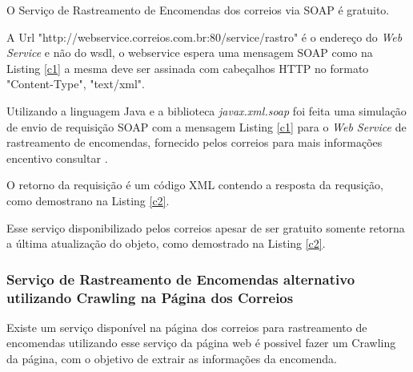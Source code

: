 \documentclass[12pt]{article}
\begin{document}
O Serviço de Rastreamento de Encomendas dos correios via SOAP é gratuito.

A Url "http://webservice.correios.com.br:80/service/rastro" é o endereço do \textit{Web Service} e não do wsdl, o webservice espera uma mensagem SOAP como na Listing \ref{c1} a mesma deve ser assinada com cabeçalhos HTTP no formato "Content-Type", "text/xml".


Utilizando a linguagem Java e a biblioteca \textit{javax.xml.soap} foi feita uma simulação de envio de requisição SOAP com a mensagem Listing \ref{c1} para o \textit{Web Service} de rastreamento de encomendas, fornecido pelos correios para mais informações encentivo consultar \cite{correios}.

O retorno da requisição é um código XML contendo a resposta da requsição, como demostrano na Listing \ref{c2}.
 
 Esse serviço disponibilizado pelos correios apesar de ser gratuito somente retorna a última atualização do objeto, como demostrado na Listing \ref{c2}.
\subsubsection{Serviço de Rastreamento de Encomendas alternativo utilizando Crawling na Página dos Correios}

	Existe um serviço disponível na página dos correios para rastreamento de encomendas utilizando esse serviço da página web é possivel fazer um Crawling da página, com o objetivo de extrair as informações da encomenda.
	
\end{document}
